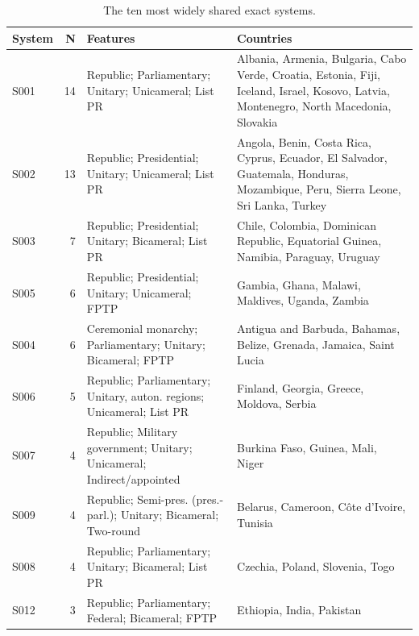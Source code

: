 \documentclass[11pt,a4paper]{article}
\begin{document}
\begin{table}[tbp]\centering\footnotesize\caption{The ten most widely shared exact systems.}\label{tab:sigs}\begin{tabular}{lrp{5.0cm}p{6.6cm}}\toprule System & N & Features & Countries\\\midrule
S001 & 14 & \raggedright Republic; Parliamentary; Unitary; Unicameral; List PR & \raggedright\arraybackslash Albania, Armenia, Bulgaria, Cabo Verde, Croatia, Estonia, Fiji, Iceland, Israel, Kosovo, Latvia, Montenegro, North Macedonia, Slovakia\\
S002 & 13 & \raggedright Republic; Presidential; Unitary; Unicameral; List PR & \raggedright\arraybackslash Angola, Benin, Costa Rica, Cyprus, Ecuador, El Salvador, Guatemala, Honduras, Mozambique, Peru, Sierra Leone, Sri Lanka, Turkey\\
S003 & 7 & \raggedright Republic; Presidential; Unitary; Bicameral; List PR & \raggedright\arraybackslash Chile, Colombia, Dominican Republic, Equatorial Guinea, Namibia, Paraguay, Uruguay\\
S005 & 6 & \raggedright Republic; Presidential; Unitary; Unicameral; FPTP & \raggedright\arraybackslash Gambia, Ghana, Malawi, Maldives, Uganda, Zambia\\
S004 & 6 & \raggedright Ceremonial monarchy; Parliamentary; Unitary; Bicameral; FPTP & \raggedright\arraybackslash Antigua and Barbuda, Bahamas, Belize, Grenada, Jamaica, Saint Lucia\\
S006 & 5 & \raggedright Republic; Parliamentary; Unitary, auton. regions; Unicameral; List PR & \raggedright\arraybackslash Finland, Georgia, Greece, Moldova, Serbia\\
S007 & 4 & \raggedright Republic; Military government; Unitary; Unicameral; Indirect/appointed & \raggedright\arraybackslash Burkina Faso, Guinea, Mali, Niger\\
S009 & 4 & \raggedright Republic; Semi-pres. (pres.-parl.); Unitary; Bicameral; Two-round & \raggedright\arraybackslash Belarus, Cameroon, Côte d'Ivoire, Tunisia\\
S008 & 4 & \raggedright Republic; Parliamentary; Unitary; Bicameral; List PR & \raggedright\arraybackslash Czechia, Poland, Slovenia, Togo\\
S012 & 3 & \raggedright Republic; Parliamentary; Federal; Bicameral; FPTP & \raggedright\arraybackslash Ethiopia, India, Pakistan\\
\bottomrule\end{tabular}\end{table}
\end{document}
